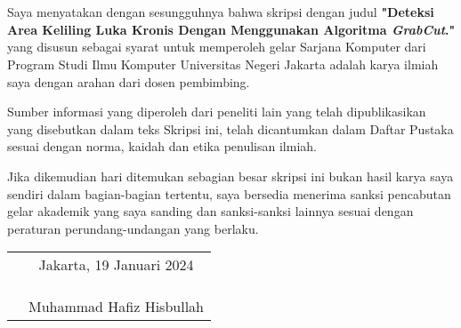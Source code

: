 \chapter*{}
\onehalfspacing{}

Saya menyatakan dengan sesungguhnya bahwa skripsi dengan judul
\textbf{"Deteksi Area Keliling Luka Kronis Dengan 
Menggunakan Algoritma \emph{GrabCut}."} yang disusun sebagai syarat untuk memperoleh gelar Sarjana Komputer
dari Program Studi Ilmu Komputer Universitas Negeri Jakarta adalah karya ilmiah
saya dengan arahan dari dosen pembimbing.

Sumber informasi yang diperoleh dari peneliti lain yang telah dipublikasikan 
yang disebutkan dalam teks Skripsi ini, telah dicantumkan dalam Daftar Pustaka 
sesuai dengan norma, kaidah dan etika penulisan ilmiah.

Jika dikemudian hari ditemukan sebagian besar skripsi ini bukan hasil karya saya 
sendiri dalam bagian-bagian tertentu, saya bersedia menerima sanksi pencabutan 
gelar akademik yang saya sanding dan sanksi-sanksi lainnya sesuai dengan 
peraturan perundang-undangan yang berlaku.

\vspace{4cm}

\begin{tabular}{p{7.5cm}c}
	&Jakarta, 19 Januari 2024\\
	&\\
	&\\
	&\\
	&Muhammad Hafiz Hisbullah
\end{tabular}
